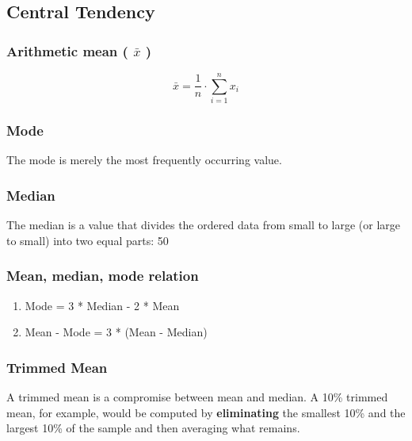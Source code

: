 \subsection{Central Tendency \cite{ism-1}}
\subsubsection{Arithmetic mean ( $\bar{x}$ ) \cite{ism-1}}\label{arithmetic_mean}
\vspace{0.2cm}
\[
    \bar{x} = \displaystyle\dfrac{1}{n} \cdot \sum^{n}_{i=1} x_i
\]

\subsubsection{Mode \cite{ism-1}}\label{mode}
The mode is merely the most frequently occurring value.

\subsubsection{Median \cite{ism-1}}\label{median}
The median is a value that divides the ordered data from small to large (or large to small) into two equal parts: 50%

\subsubsection{Mean, median, mode relation}\label{mean, median, mode relation}

\begin{enumerate}
    \item Mode = 3 * Median - 2 * Mean
    \item Mean - Mode = 3 * (Mean - Median)
\end{enumerate}


\subsubsection{Trimmed Mean \cite{ism-1}}\label{Trimmed Mean}
A trimmed mean is a compromise between mean and median. A 10\% trimmed mean, for example, would be computed by \textbf{eliminating} the smallest 10\% and the largest 10\% of the sample and then averaging what remains.

